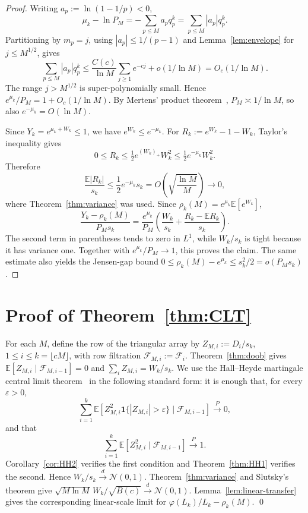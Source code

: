 \documentclass[11pt]{article}
\theoremstyle{remark}
\newcommand{\EE}{\mathbb{E}}
\newcommand{\NN}{\mathcal{N}}
\newcommand{\F}{\mathcal{F}}
\newcommand{\one}{\mathbf{1}}
\begin{document}
\begin{proof}
Writing $a_p:=\ln(1-1/p)<0$,
\[
\mu_k-\ln P_M=-\sum_{p\leq M}a_pq_p^k
=\sum_{p\leq M}|a_p|q_p^k.
\]
Partitioning by $m_p=j$, using $|a_p|\leq1/(p-1)$ and Lemma~\ref{lem:envelope} for $j\leq M^{1/2}$, gives
\[
\sum_{p\leq M}|a_p|q_p^k
\leq \frac{C(c)}{\ln M}\sum_{j\geq1}e^{-cj}+o(1/\ln M)
=O_c(1/\ln M).
\]
The range $j>M^{1/2}$ is super-polynomially small. Hence $e^{\mu_k}/P_M=1+O_c(1/\ln M)$. By Mertens' product theorem~\cite{Tenenbaum2015}, $P_M\asymp1/\ln M$, so also $e^{-\mu_k}=O(\ln M)$.

Since $Y_k=e^{\mu_k+W_k}\leq1$, we have $e^{W_k}\leq e^{-\mu_k}$. For
$R_k:=e^{W_k}-1-W_k$, Taylor's inequality gives
\[
0\leq R_k\leq \tfrac12 e^{(W_k)_+}W_k^2
\leq \tfrac12 e^{-\mu_k}W_k^2.
\]
Therefore
\[
\frac{\EE|R_k|}{s_k}
\leq \frac12 e^{-\mu_k}s_k
=O\!\left(\sqrt{\frac{\ln M}{M}}\right)\longrightarrow0,
\]
where Theorem~\ref{thm:variance} was used. Since $\rho_k(M)=e^{\mu_k}\EE[e^{W_k}]$,
\[
\frac{Y_k-\rho_k(M)}{P_Ms_k}
=\frac{e^{\mu_k}}{P_M}\left(\frac{W_k}{s_k}+\frac{R_k-\EE R_k}{s_k}\right).
\]
The second term in parentheses tends to zero in $L^1$, while $W_k/s_k$ is tight because it has variance one. Together with $e^{\mu_k}/P_M\to1$, this proves the claim. The same estimate also yields the Jensen-gap bound
$0\leq\rho_k(M)-e^{\mu_k}\leq s_k^2/2=o(P_Ms_k)$.
\end{proof}

\section{Proof of Theorem~\ref{thm:CLT}}\label{sec:conclusion-clt}

For each $M$, define the row of the triangular array by
$Z_{M,i}:=D_i/s_k$, $1\leq i\leq k=\lfloor cM\rfloor$, with row filtration $\F_{M,i}:=\F_i$. Theorem~\ref{thm:doob} gives
$\EE[Z_{M,i}\mid\F_{M,i-1}]=0$ and $\sum_iZ_{M,i}=W_k/s_k$. We use the Hall--Heyde martingale central limit theorem~\cite[Thm.~3.2]{HH} in the following standard form: it is enough that, for every $\varepsilon>0$,
\[
\sum_{i=1}^k\EE\!\left[Z_{M,i}^2\one\{|Z_{M,i}|>\varepsilon\}\mid\F_{M,i-1}\right]\xrightarrow{P}0,
\]
and that
\[
\sum_{i=1}^k\EE[Z_{M,i}^2\mid\F_{M,i-1}]\xrightarrow{P}1.
\]
Corollary~\ref{cor:HH2} verifies the first condition and Theorem~\ref{thm:HH1} verifies the second. Hence $W_k/s_k\xrightarrow{d}\NN(0,1)$. Theorem~\ref{thm:variance} and Slutsky's theorem give $\sqrt{M \ln M}\,W_k/\sqrt{B(c)}\xrightarrow{d}\NN(0,1)$. Lemma~\ref{lem:linear-transfer} gives the corresponding linear-scale limit for $\varphi(L_k)/L_k-\rho_k(M)$.
\qed
\end{document}
